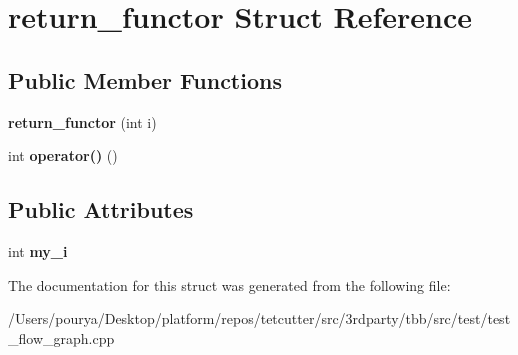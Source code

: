 \hypertarget{structreturn__functor}{}\section{return\+\_\+functor Struct Reference}
\label{structreturn__functor}
\subsection*{Public Member Functions}
\begin{DoxyCompactItemize}
\item 
\hypertarget{structreturn__functor_a42be637b91dbc2f9207d8c909b5cc7c5}{}{\bfseries return\+\_\+functor} (int i)\label{structreturn__functor_a42be637b91dbc2f9207d8c909b5cc7c5}

\item 
\hypertarget{structreturn__functor_aae7475a3f16cf6907d9ee51da567eba1}{}int {\bfseries operator()} ()\label{structreturn__functor_aae7475a3f16cf6907d9ee51da567eba1}

\end{DoxyCompactItemize}
\subsection*{Public Attributes}
\begin{DoxyCompactItemize}
\item 
\hypertarget{structreturn__functor_af0738d038064cd05e1cef783bcc19ae2}{}int {\bfseries my\+\_\+i}\label{structreturn__functor_af0738d038064cd05e1cef783bcc19ae2}

\end{DoxyCompactItemize}


The documentation for this struct was generated from the following file\+:\begin{DoxyCompactItemize}
\item 
/\+Users/pourya/\+Desktop/platform/repos/tetcutter/src/3rdparty/tbb/src/test/test\+\_\+flow\+\_\+graph.\+cpp\end{DoxyCompactItemize}
